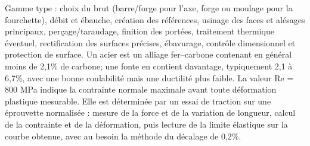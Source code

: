 \begin{corrigebox}
Gamme type : choix du brut (barre/forge pour l'axe, forge ou moulage pour
            la fourchette), débit et ébauche, création des références, usinage des faces et
            alésages principaux, perçage/taraudage, finition des portées, traitement
            thermique éventuel, rectification des surfaces précises, ébavurage, contrôle
            dimensionnel et protection de surface.
Un acier est un alliage fer--carbone contenant en général moins de
            2,1\% de carbone; une fonte en contient davantage, typiquement 2,1 à 6,7\%,
            avec une bonne coulabilité mais une ductilité plus faible.
La valeur Re = 800 MPa indique la contrainte normale maximale avant toute
            déformation plastique mesurable. Elle est déterminée par un essai de traction
            sur une éprouvette normalisée : mesure de la force et de la variation de longueur,
            calcul de la contrainte et de la déformation, puis lecture de la limite élastique
            sur la courbe obtenue, avec au besoin la méthode du décalage de 0,2\%.
\end{corrigebox}